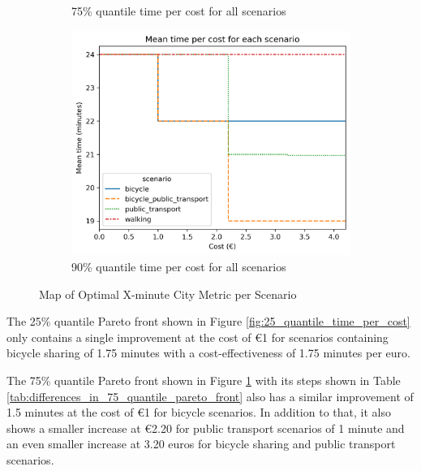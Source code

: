\begin{figure}
\begin{subfigure}[b]{0.48\textwidth}
         \caption{75\% quantile time per cost for all scenarios}
         \label{fig:75_quantile_time_per_cost}
     \end{subfigure}
     \hfill
     \begin{subfigure}[b]{0.48\textwidth}
         \centering
         \includegraphics[width=\textwidth]{Figures/results/metric_cost/quantile_90_time_per_cost_for_each_scenario_without_car.png}
         \caption{90\% quantile time per cost for all scenarios}
         \label{fig:90_quantile_time_per_cost}
     \end{subfigure}
        \caption{Map of Optimal X-minute City Metric per Scenario}
        \label{fig:quantile_time_per_cost}
\end{figure}

The 25\% quantile Pareto front shown in Figure \ref{fig:25_quantile_time_per_cost} only contains a single improvement at the cost of \euro{1} for scenarios containing bicycle sharing of 1.75 minutes with a cost-effectiveness of 1.75 minutes per euro.


The 75\% quantile Pareto front shown in Figure \ref{fig:75_quantile_time_per_cost} with its steps shown in Table \ref{tab:differences_in_75_quantile_pareto_front} also has a similar improvement of 1.5 minutes at the cost of \euro{1} for bicycle scenarios.
In addition to that, it also shows a smaller increase at \euro{2.20} for public transport scenarios of 1 minute and an even smaller increase at 3.20 euros for bicycle sharing and public transport scenarios.

